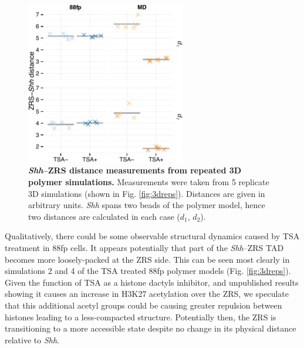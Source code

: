 \documentclass[a4paper,11pt,oneside]{book}
\begin{document}
\begin{figure}
\begin{center} 
\includegraphics[width=2.75in]{figs/3d_dists.pdf}
\captionsetup{width=\textwidth} 
\caption[ \emph{Shh}--ZRS distance measurements from repeated 3D polymer simulations. ]{ {\bf \emph{Shh}--ZRS distance measurements from repeated 3D polymer simulations. }
Measurements were taken from 5 replicate 3D simulations (shown in Fig. \ref{fig:3dreps}). Distances are given in arbitrary units. \emph{Shh} spans two beads of the polymer model, hence two distances are calculated in each case ($d_1$, $d_2$).
}\label{fig:3ddist}
\end{center} 
\end{figure} 

Qualitatively, there could be some observable structural dynamics caused by TSA treatment in 88fp cells. It appears potentially that part of the \emph{Shh}--ZRS TAD becomes more loosely-packed at the ZRS side. This can be seen most clearly in simulations 2 and 4 of the TSA treated 88fp polymer models (Fig. \ref{fig:3dreps}). Given the function of TSA as a histone dactyls inhibitor, and unpublished results showing it causes an increase in H3K27 acetylation over the ZRS, we speculate that this additional acetyl groups could be causing greater repulsion between histones leading to a less-compacted structure. Potentially then, the ZRS is transitioning to a more accessible state despite no change in its physical distance relative to \emph{Shh}.

\end{document}
